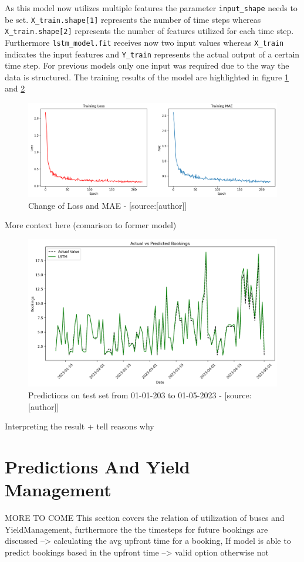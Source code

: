 As this model now utilizes multiple features the parameter \verb|input_shape| needs to be set.  \verb|X_train.shape[1]| represents the number of time steps whereas \verb|X_train.shape[2]| represents the number of features utilized for each time step. Furthermore \verb|lstm_model.fit| receives now two input values whereas \verb|X_train| indicates the input features and \verb|Y_train| represents the actual output of a certain time step. For previous models only one input was required due to the way the data is structured. 
The training results of the model are highlighted in figure \ref{fig:lstm_multi_1_mae} and \ref{fig:lstm_multi_1_prediction} 
\begin{figure}[H]
	\centering
		\includegraphics[width=14cm]{images/lstm_multi_1_mae}
	\caption{Change of Loss and MAE - [source:[author]]}
	\label{fig:lstm_multi_1_mae}
\end{figure}
More context here (comarison to former model)
\begin{figure}[H]
	\centering
		\includegraphics[width=14cm]{images/lstm_multi_1_prediction}
	\caption{Predictions on test set from 01-01-203 to 01-05-2023 - [source:[author]]}
	\label{fig:lstm_multi_1_prediction}
\end{figure}
Interpreting the result + tell reasons why 

\section{Predictions And Yield Management}
MORE TO COME 
This section covers the relation of utilization of buses and YieldManagement, furthermore the the timesteps for future bookings are discussed --> calculating the avg upfront time for a booking, If model is able to predict bookings based in the upfront time --> valid option otherwise not 